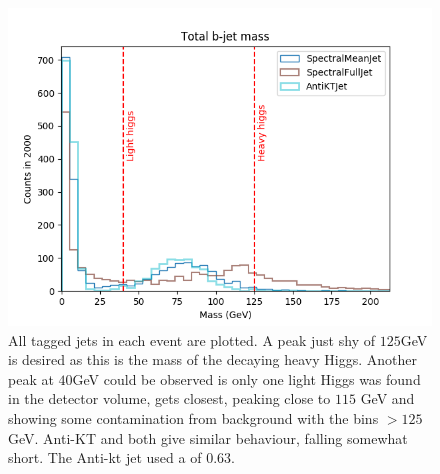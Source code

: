 \begin{figure}[htp]
    \begin{minipage}[c]{0.5\textwidth}
        \includegraphics[width=1\textwidth]{graphics/best_all.png}
    \end{minipage}\hfill
    \begin{minipage}[c]{0.45\textwidth}
        \caption{All tagged jets in each event are plotted.
            A peak just shy of \(125\)GeV is desired as this is the mass of the decaying
            heavy Higgs.
            Another peak at \(40\)GeV could be observed is only one light Higgs
            was found in the detector volume,
            \spectralfulljet{} gets closest, peaking close to \(115\) GeV and
            showing some contamination from background with the bins \(>125\) GeV.
            Anti-KT and \spectralmeanjet{} both give similar behaviour, falling somewhat short.
            The Anti-kt jet used a \stoppingdeltar{} of \(0.63\).
        }\label{fig:best_all}
    \end{minipage}
\end{figure}    


